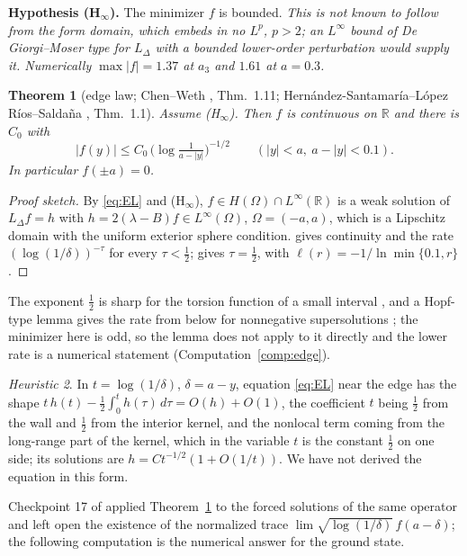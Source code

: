 \documentclass[11pt]{article}
\newtheorem{theorem}{Theorem}[section]
\theoremstyle{definition}
\theoremstyle{remark}
\newtheorem{heuristic}[theorem]{Heuristic}
\newcommand{\R}{\mathbb{R}}
\begin{document}
\medskip
\noindent\textbf{Hypothesis (H$_\infty$).} The minimizer $f$ is bounded. \emph{This is not known to follow from the form domain, which embeds in no $L^p$, $p>2$; an $L^\infty$ bound of De Giorgi--Moser type for $L_\Delta$ with a bounded lower-order perturbation would supply it. Numerically $\max|f|=1.37$ at $a_3$ and $1.61$ at $a=0.3$.}

\begin{theorem}[edge law; Chen--Weth \cite{chen-weth}, Thm.\ 1.11; Hern\'andez-Santamar\'ia--L\'opez R\'ios--Salda\~na \cite{hls}, Thm.\ 1.1]\label{thm:edge}
Assume (H$_\infty$). Then $f$ is continuous on $\R$ and there is $C_0$ with
\[
|f(y)|\le C_0\,\big(\log\tfrac1{a-|y|}\big)^{-1/2}\qquad(|y|<a,\ a-|y|<0.1).
\]
In particular $f(\pm a)=0$.
\end{theorem}
\begin{proof}[Proof sketch]
By \eqref{eq:EL} and (H$_\infty$), $f\in H(\Omega)\cap L^\infty(\R)$ is a weak solution of $L_\Delta f=h$ with $h=2(\lambda-B)f\in L^\infty(\Omega)$, $\Omega=(-a,a)$, which is a Lipschitz domain with the uniform exterior sphere condition. \cite[Thm.\ 1.11]{chen-weth} gives continuity and the rate $(\log(1/\delta))^{-\tau}$ for every $\tau<\tfrac12$; \cite[Thm.\ 1.1]{hls} gives $\tau=\tfrac12$, with $\ell(r)=-1/\ln\min\{0.1,r\}$.
\end{proof}

The exponent $\tfrac12$ is sharp for the torsion function of a small interval \cite[Thm.\ 1.2]{hls}, and a Hopf-type lemma gives the rate from below for nonnegative supersolutions \cite[Thm.\ 1.4]{hls}; the minimizer here is odd, so the lemma does not apply to it directly and the lower rate is a numerical statement (Computation~\ref{comp:edge}).

\begin{heuristic}\label{heur:edge}
In $t=\log(1/\delta)$, $\delta=a-y$, equation \eqref{eq:EL} near the edge has the shape $t\,h(t)-\tfrac12\int_0^t h(\tau)\,d\tau=O(h)+O(1)$, the coefficient $t$ being $\tfrac12$ from the wall and $\tfrac12$ from the interior kernel, and the nonlocal term coming from the long-range part of the kernel, which in the variable $t$ is the constant $\tfrac12$ on one side; its solutions are $h=Ct^{-1/2}(1+O(1/t))$. We have not derived the equation in this form.
\end{heuristic}

Checkpoint 17 of \cite{michaels-atlas} applied Theorem~\ref{thm:edge} to the forced solutions of the same operator and left open the existence of the normalized trace $\lim\sqrt{\log(1/\delta)}\,f(a-\delta)$; the following computation is the numerical answer for the ground state.
\end{document}
